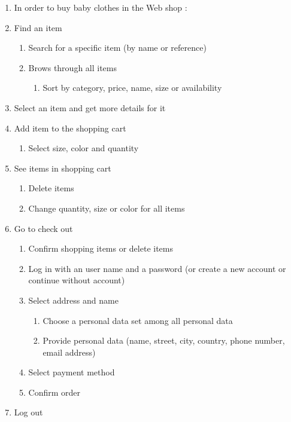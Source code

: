 \begin{enumerate}[label*=\arabic*.,start=0,itemsep=-4pt]
  \item In order to buy baby clothes in the Web shop :
  \item Find an item 
    \begin{enumerate}[label*=\arabic*.,itemsep=-4pt]
      \item Search for a specific item (by name or reference)
      \item Brows through all items
				\begin{enumerate}[label*=\arabic*.,itemsep=-4pt]
				  \item Sort by category, price, name, size or availability
        \end{enumerate}
    \end{enumerate}
  \item Select an item and get more details for it
  \item Add item to the shopping cart
    \begin{enumerate}[label*=\arabic*.,itemsep=-4pt]
      \item Select size, color and quantity
    \end{enumerate}
  \item See items in shopping cart
    \begin{enumerate}[label*=\arabic*.,itemsep=-4pt]
      \item Delete items
      \item Change quantity, size or color for all items
    \end{enumerate}
  \item Go to check out
    \begin{enumerate}[label*=\arabic*.,itemsep=-4pt]
      \item Confirm shopping items or delete items
      \item Log in with an user name and a password (or create a new account or continue without account)
      \item Select address and name
	\begin{enumerate}[label*=\arabic*.,itemsep=-4pt]
	  \item Choose a personal data set among all personal data 
	  \item Provide personal data (name, street, city, country, phone number, email address)
        \end{enumerate}
      \item Select payment method
      \item Confirm order      
    \end{enumerate}
  \item Log out
\end{enumerate}
